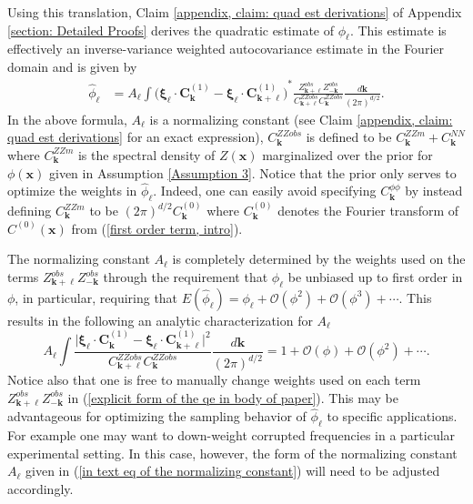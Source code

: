 \documentclass[10pt,noinfoline]{imsart}
\newcommand{\bs}{\boldsymbol}
\begin{document}
Using this translation, Claim \ref{appendix, claim: quad est derivations} of Appendix \ref{section: Detailed Proofs} derives the quadratic estimate of $\phi_{\bs \ell}$. This estimate is effectively  an inverse-variance weighted autocovariance estimate in the Fourier domain and is given by
\begin{align}
    \label{explicit form of the qe in body of paper}
    \hat\phi_{\bs \ell}
    &=  A_{\bs \ell}
        \int
        {\Big(\bs\xi_{\bs \ell} \!\cdot\!\bs C^{{(1)}}_{\bs k} - \bs\xi_{\bs \ell} \!\cdot\!\bs C^{{(1)}}_{\bs k+\bs \ell}\Big)}^{\! *}
        \frac{Z^{obs}_{\bs k+\bs \ell}Z^{obs}_{-\bs k}}{C^{ZZobs}_{\bs k+\bs \ell}C^{ZZobs}_{\bs k}}\frac{d\bs k}{{(2\pi)}^{d/2}}.
\end{align}
In the above formula, $A_{\bs \ell}$ is a normalizing constant (see Claim \ref{appendix, claim: quad est derivations} for an exact expression),  $C^{ZZobs}_{\bs k}$ is defined to be $C^{ZZm}_{\bs k} + C^{N\!N}_{\bs k}$ where $C^{ZZm}_{\bs k}$ is the spectral density of $Z(\bs x)$ marginalized over the prior for $\phi(\bs x)$ given in Assumption \ref{Assumption 3}. Notice that the prior only serves to optimize the weights in $\hat\phi_{\bs \ell}$. Indeed, one can easily avoid specifying $C_{\bs k}^{\phi\phi}$ by instead defining $C^{ZZm}_{\bs k}$ to be ${(2\pi)}^{d/2}C^{(0)}_{\bs k}$ where $C^{(0)}_{\bs k}$ denotes the Fourier transform of $C^{(0)}(\bs x)$ from (\ref{first order term, intro}).

The normalizing constant $A_{\bs \ell}$ is completely determined by the weights used on the terms $Z^{obs}_{\bs k+\bs \ell}Z^{obs}_{-\bs k}$ through the requirement that $\hat\phi_{\bs \ell}$ be unbiased up to first order in $\phi$, in particular, requiring that $E(\hat\phi_{\bs \ell}) = \phi_{\bs \ell} + \mathcal O(\phi^2)+ \mathcal O(\phi^3)+\cdots$. 
This results in the following an analytic characterization for $A_{\bs \ell}$
\begin{equation}
\label{in text eq of the normalizing constant}
A_{\bs \ell}
        \int
        \frac{\big|{\bs\xi_{\bs\ell}\!\cdot\! \bs C^{(1)}_{\bs k} - \bs\xi_{\bs\ell}\!\cdot\! \bs C_{\bs k+\bs \ell}^{(1)}}\big|^2}{C^{ZZobs}_{\bs k+\bs \ell}C^{ZZobs}_{\bs k}}\frac{d\bs k}{{(2\pi)}^{d/2}} = 1 + \mathcal O(\phi) + \mathcal O(\phi^2)+\cdots.
\end{equation}
Notice also that one is free to manually change weights used on each term $Z^{obs}_{\bs k+\bs \ell}Z^{obs}_{-\bs k}$ in  (\ref{explicit form of the qe in body of paper}). This may be advantageous for optimizing the sampling behavior of $\hat\phi_{\bs \ell}$ to specific applications. For example one may want to down-weight corrupted frequencies in a particular experimental setting. In this case, however, the form of the normalizing constant $A_{\bs \ell}$ given in (\ref{in text eq of the normalizing constant}) will need to be adjusted accordingly.
\end{document}
